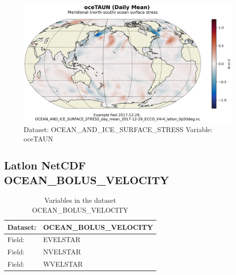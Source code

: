 \begin{figure}[H]
\centering
\includegraphics[scale=0.55]{../images/plots/latlon_plots/Ocean_and_Sea-Ice_Surface_Stress/oceTAUN.png}
\caption{Dataset: OCEAN\_AND\_ICE\_SURFACE\_STRESS Variable: oceTAUN}
\label{tab:table-OCEAN_AND_ICE_SURFACE_STRESS_oceTAUN-Plot}
\end{figure}
\pagebreak
\subsection{Latlon NetCDF OCEAN\_BOLUS\_VELOCITY}
\newp
\begin{longtable}{|p{}|p{}|}
\caption{Variables in the dataset OCEAN\_BOLUS\_VELOCITY}
\label{tab:table-OCEAN_BOLUS_VELOCITY-fields} \\ 
\hline \endhead \hline \endfoot
\rowcolor{lightgray} \textbf{Dataset:} & \textbf{OCEAN\_BOLUS\_VELOCITY} \\ \hline
Field: &EVELSTAR \\ \hline
Field: &NVELSTAR \\ \hline
Field: &WVELSTAR \\ \hline
\end{longtable}

\pagebreak
